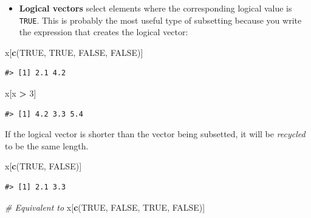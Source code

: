 \documentclass[]{book}
\newenvironment{Shaded}{\begin{snugshade}}{\end{snugshade}}
\newcommand{\KeywordTok}[1]{\textcolor[rgb]{0.13,0.29,0.53}{\textbf{#1}}}
\newcommand{\DecValTok}[1]{\textcolor[rgb]{0.00,0.00,0.81}{#1}}
\newcommand{\StringTok}[1]{\textcolor[rgb]{0.31,0.60,0.02}{#1}}
\newcommand{\CommentTok}[1]{\textcolor[rgb]{0.56,0.35,0.01}{\textit{#1}}}
\newcommand{\OtherTok}[1]{\textcolor[rgb]{0.56,0.35,0.01}{#1}}
\newcommand{\OperatorTok}[1]{\textcolor[rgb]{0.81,0.36,0.00}{\textbf{#1}}}
\newcommand{\NormalTok}[1]{#1}
\providecommand{\tightlist}{%
  \setlength{\itemsep}{0pt}\setlength{\parskip}{0pt}}
\theoremstyle{definition}
\theoremstyle{definition}
\theoremstyle{definition}
\theoremstyle{remark}
\begin{document}
\begin{itemize}
\tightlist
\item
  \textbf{Logical vectors} select elements where the corresponding
  logical value is \texttt{TRUE}. This is probably the most useful type
  of subsetting because you write the expression that creates the
  logical vector:
\end{itemize}

\begin{Shaded}
\begin{Highlighting}[]
\NormalTok{x[}\KeywordTok{c}\NormalTok{(}\OtherTok{TRUE}\NormalTok{, }\OtherTok{TRUE}\NormalTok{, }\OtherTok{FALSE}\NormalTok{, }\OtherTok{FALSE}\NormalTok{)]}
\end{Highlighting}
\end{Shaded}

\begin{verbatim}
#> [1] 2.1 4.2
\end{verbatim}

\begin{Shaded}
\begin{Highlighting}[]
\NormalTok{x[x }\OperatorTok{>}\StringTok{ }\DecValTok{3}\NormalTok{]}
\end{Highlighting}
\end{Shaded}

\begin{verbatim}
#> [1] 4.2 3.3 5.4
\end{verbatim}

If the logical vector is shorter than the vector being subsetted, it
will be \emph{recycled} to be the same length.

\begin{Shaded}
\begin{Highlighting}[]
\NormalTok{x[}\KeywordTok{c}\NormalTok{(}\OtherTok{TRUE}\NormalTok{, }\OtherTok{FALSE}\NormalTok{)]}
\end{Highlighting}
\end{Shaded}

\begin{verbatim}
#> [1] 2.1 3.3
\end{verbatim}

\begin{Shaded}
\begin{Highlighting}[]
\CommentTok{# Equivalent to}
\NormalTok{x[}\KeywordTok{c}\NormalTok{(}\OtherTok{TRUE}\NormalTok{, }\OtherTok{FALSE}\NormalTok{, }\OtherTok{TRUE}\NormalTok{, }\OtherTok{FALSE}\NormalTok{)]}
\end{Highlighting}
\end{Shaded}
\end{document}
